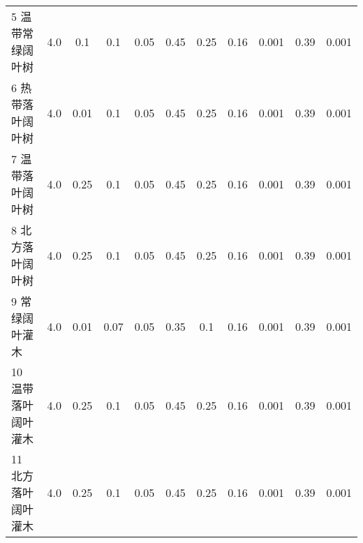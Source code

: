 \begin{landscape}
\begin{table}[htbp]
\begin{tabular}{@{}lcccccccccc@{}}
      5 温带常绿阔叶树    & 4.0              & 0.1                   & 0.1                      & 0.05                     & 0.45                     & 0.25                     & 0.16                     & 0.001                    & 0.39                     & 0.001                   \\
      6 热带落叶阔叶树    & 4.0              & 0.01                  & 0.1                      & 0.05                     & 0.45                     & 0.25                     & 0.16                     & 0.001                    & 0.39                     & 0.001                   \\
      7 温带落叶阔叶树    & 4.0              & 0.25                  & 0.1                      & 0.05                     & 0.45                     & 0.25                     & 0.16                     & 0.001                    & 0.39                     & 0.001                   \\
      8 北方落叶阔叶树    & 4.0              & 0.25                  & 0.1                      & 0.05                     & 0.45                     & 0.25                     & 0.16                     & 0.001                    & 0.39                     & 0.001                   \\
      9 常绿阔叶灌木      & 4.0              & 0.01                  & 0.07                     & 0.05                     & 0.35                     & 0.1                      & 0.16                     & 0.001                    & 0.39                     & 0.001                   \\
      10 温带落叶阔叶灌木 & 4.0              & 0.25                  & 0.1                      & 0.05                     & 0.45                     & 0.25                     & 0.16                     & 0.001                    & 0.39                     & 0.001                   \\
      11 北方落叶阔叶灌木 & 4.0              & 0.25                  & 0.1                      & 0.05                     & 0.45                     & 0.25                     & 0.16                     & 0.001                    & 0.39                     & 0.001                   \\ %
%
%

\end{tabular}
\end{table}
\end{landscape}
